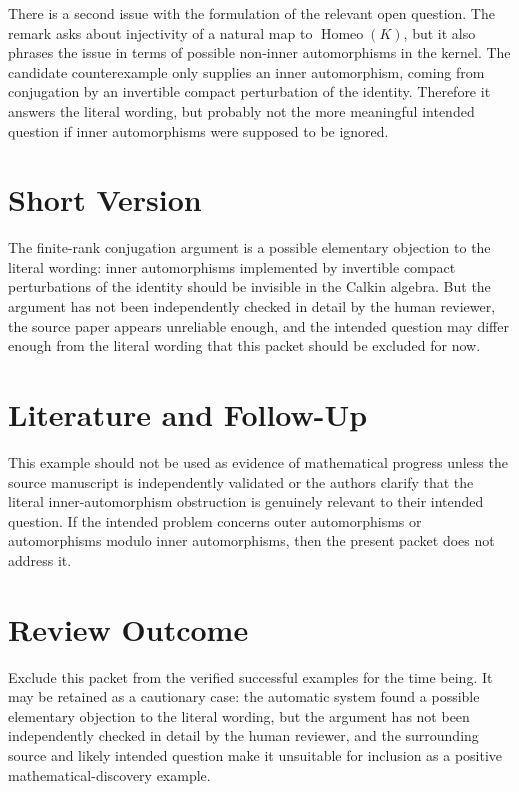 \documentclass[11pt]{article}
\newcommand{\Homeo}{\operatorname{Homeo}}
\begin{document}
There is a second issue with the formulation of the relevant open question.
The remark asks about injectivity of a natural map to \(\Homeo(K)\), but it
also phrases the issue in terms of possible non-inner automorphisms in the
kernel.  The candidate counterexample only supplies an inner automorphism,
coming from conjugation by an invertible compact perturbation of the
identity.  Therefore it answers the literal wording, but probably not the
more meaningful intended question if inner automorphisms were supposed to be
ignored.

\section*{Short Version}

The finite-rank conjugation argument is a possible elementary objection to
the literal wording: inner automorphisms implemented by invertible compact
perturbations of the identity should be invisible in the Calkin algebra.  But
the argument has not been independently checked in detail by the human
reviewer, the source paper appears unreliable enough, and the intended
question may differ enough from the literal wording that this packet should
be excluded for now.

\section*{Literature and Follow-Up}

This example should not be used as evidence of mathematical progress unless
the source manuscript is independently validated or the authors clarify that
the literal inner-automorphism obstruction is genuinely relevant to their
intended question.  If the intended problem concerns outer automorphisms or
automorphisms modulo inner automorphisms, then the present packet does not
address it.

\section*{Review Outcome}

Exclude this packet from the verified successful examples for the time being.
It may be retained as a cautionary case: the automatic system found a
possible elementary objection to the literal wording, but the argument has
not been independently checked in detail by the human reviewer, and the
surrounding source and likely intended question make it unsuitable for
inclusion as a positive mathematical-discovery example.
\end{document}
